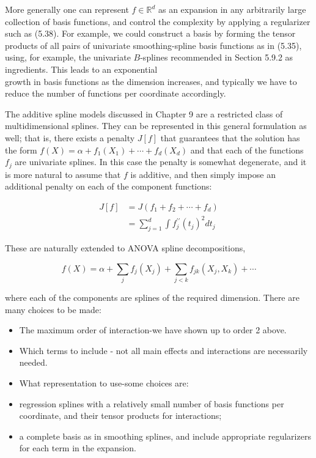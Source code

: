 \documentclass[10pt]{article}
\begin{document}
More generally one can represent $f \in \mathbb{R}^{d}$ as an expansion in any arbitrarily large collection of basis functions, and control the complexity by applying a regularizer such as (5.38). For example, we could construct a basis by forming the tensor products of all pairs of univariate smoothing-spline basis functions as in (5.35), using, for example, the univariate $B$-splines recommended in Section 5.9.2 as ingredients. This leads to an exponential\\
growth in basis functions as the dimension increases, and typically we have to reduce the number of functions per coordinate accordingly.

The additive spline models discussed in Chapter 9 are a restricted class of multidimensional splines. They can be represented in this general formulation as well; that is, there exists a penalty $J[f]$ that guarantees that the solution has the form $f(X)=\alpha+f_{1}\left(X_{1}\right)+\cdots+f_{d}\left(X_{d}\right)$ and that each of the functions $f_{j}$ are univariate splines. In this case the penalty is somewhat degenerate, and it is more natural to assume that $f$ is additive, and then simply impose an additional penalty on each of the component functions:


\begin{align*}
J[f] & =J\left(f_{1}+f_{2}+\cdots+f_{d}\right) \\
& =\sum_{j=1}^{d} \int f_{j}^{\prime \prime}\left(t_{j}\right)^{2} d t_{j} \tag{5.40}
\end{align*}


These are naturally extended to ANOVA spline decompositions,


\begin{equation*}
f(X)=\alpha+\sum_{j} f_{j}\left(X_{j}\right)+\sum_{j<k} f_{j k}\left(X_{j}, X_{k}\right)+\cdots \tag{5.41}
\end{equation*}


where each of the components are splines of the required dimension. There are many choices to be made:

\begin{itemize}
  \item The maximum order of interaction-we have shown up to order 2 above.
  \item Which terms to include - not all main effects and interactions are necessarily needed.
  \item What representation to use-some choices are:
  \item regression splines with a relatively small number of basis functions per coordinate, and their tensor products for interactions;
  \item a complete basis as in smoothing splines, and include appropriate regularizers for each term in the expansion.
\end{itemize}
\end{document}
